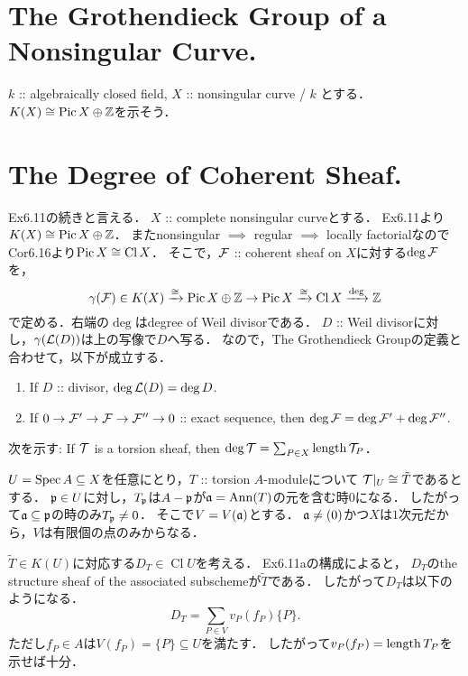 \documentclass[a4paper]{jsarticle}
\newcommand{\Cl}{\operatorname{Cl}}
\newcommand{\Pic}{\operatorname{Pic}}
\begin{document}
\section{The Grothendieck Group of a Nonsingular Curve.} %
    $k$ :: algebraically closed field, $X$ :: nonsingular curve / $k$
    とする．$K(X) \cong \Pic X \oplus \Z$を示そう．

\section{The Degree of Coherent Sheaf.} %
    Ex6.11の続きと言える．
    $X$ :: complete nonsingular curveとする．
    Ex6.11より$K(X) \iso \Pic X \oplus \Z$．
    またnonsingular $\implies$ regular $\implies$ locally factorialなので
    Cor6.16より$\Pic X \iso \Cl X$．
    そこで，$\mathcal{F}$ :: coherent sheaf on $X$に対する$\deg \mathcal{F}$を，
    \[ \gamma(\shF) \in K(X) \isomap \Pic X \oplus \Z \to \Pic X \isomap \Cl X \xrightarrow{\deg} \Z \]
    で定める．右端の$\deg$はdegree of Weil divisorである．
    $D$ :: Weil divisorに対し，$\gamma(\mathcal{L}(D))$は上の写像で$D$へ写る．
    なので，The Grothendieck Groupの定義と合わせて，以下が成立する．

    \begin{enumerate}[label=(\arabic*)]
        \item If $D$ :: divisor, $\deg \mathcal{L}(D)=\deg D$.
        \item If $0 \to \mathcal{F}' \to \mathcal{F} \to \mathcal{F}'' \to 0$ :: exact sequence, 
            then $\deg \mathcal{F}=\deg \mathcal{F}'+\deg \mathcal{F}''$.
    \end{enumerate}
    次を示す:
    If $\mathcal{T}$ is a torsion sheaf, then $\deg \mathcal{T}=\sum_{P \in X} \operatorname{length} \mathcal{T}_P$．

    $U=\operatorname{Spec} A \subseteq X$を任意にとり，$T$ :: torsion $A$-moduleについて
    $\mathcal{T}|_U \cong \tilde{T}$であるとする．
    $\mathfrak{p} \in U$に対し，$T_{\mathfrak{p}}$は$A-\mathfrak{p}$が$\mathfrak{a}=\operatorname{Ann}(T)$の元を含む時$0$になる．
    したがって$\mathfrak{a} \subseteq \mathfrak{p}$の時のみ$T_{\mathfrak{p}} \neq 0$．
    そこで$V=V(\mathfrak{a})$とする．
    $\mathfrak{a} \neq (0)$かつ$X$は$1$次元だから，$V$は有限個の点のみからなる．


    $\tilde{T} \in K(U)$に対応する$D_T \in \Cl U$を考える．
    Ex6.11aの構成によると，
    $D_T$のthe structure sheaf of the associated subschemeが$\tilde{T}$である．
    したがって$D_T$は以下のようになる．
    \[ D_T=\sum_{P \in V} v_P(f_P) \{P\}. \]
    ただし$f_P \in A$は$V(f_P)=\{P\} \subseteq U$を満たす．
    したがって$v_P(f_P)=\operatorname{length} T_P$を示せば十分．
\end{document}
